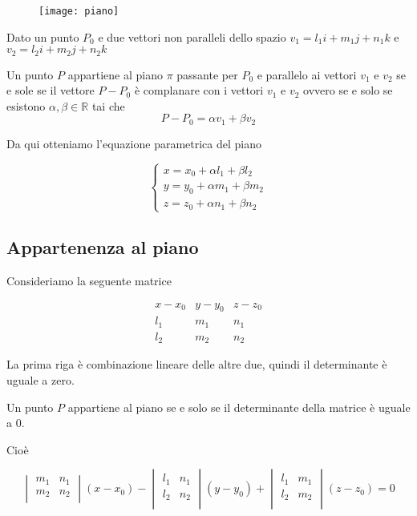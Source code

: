 \begin{figure}[H]
\texttt{[image: piano]}
\centering
\end{figure}

Dato un punto $P_0$ e due vettori non paralleli dello spazio $v_1=l_1i+m_1j+n_1k$ e $v_2=l_2i+m_2j+n_2k$

Un punto $P$ appartiene al piano  $\pi$ passante per $P_0$ e parallelo ai vettori $v_1$ e $v_2$ se e sole se il vettore $P-P_0$ è complanare con i vettori $v_1$ e $v_2$ ovvero se e solo se esistono $\alpha, \beta \in \mathbb{R}$ tai che $$P-P_0 = \alpha v_1 + \beta v_2$$

Da qui otteniamo l'equazione parametrica del piano

$$
\begin{cases}
x = x_0 + \alpha l_1 + \beta l_2 \\
y = y_0 + \alpha m_1 + \beta m_2 \\
z = z_0 + \alpha n_1 + \beta n_2
\end{cases}
$$

\subsection{Appartenenza al piano}

Consideriamo la seguente matrice

$$
\begin{matrix}
x-x_0 & y-y_0 & z-z_0 \\
l_1 & m_1 & n_1 \\
l_2 & m_2 & n_2
\end{matrix}
$$

La prima riga è combinazione lineare delle altre due, quindi il determinante è uguale a zero.

Un punto $P$ appartiene al piano se e solo se il determinante della matrice è uguale a 0.

Cioè

$$
\begin{vmatrix}
m_1 & n_1 \\
m_2 & n_2 \\
\end{vmatrix}
(x-x_0)
-
\begin{vmatrix}
l_1 & n_1 \\
l_2 & n_2 \\
\end{vmatrix}
(y-y_0)
+
\begin{vmatrix}
l_1 & m_1 \\
l_2 & m_2 \\
\end{vmatrix}
(z-z_0) = 0
$$

